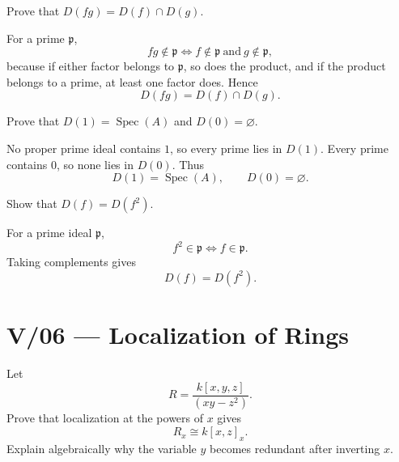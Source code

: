 \begin{problem}[CP-V-0102]
\label{prob:cp-v-0102}
Prove that \(D(fg)=D(f)\cap D(g)\).
\end{problem}

\begin{solution}
For a prime \(\mathfrak p\),
\[
fg\notin\mathfrak p
\iff
f\notin\mathfrak p\ \text{and}\ g\notin\mathfrak p,
\]
because if either factor belongs to \(\mathfrak p\), so does the product, and if the product belongs to a prime, at least one factor does. Hence
\[
D(fg)=D(f)\cap D(g).
\]
\end{solution}


\begin{problem}[CP-V-0103]
\label{prob:cp-v-0103}
Prove that \(D(1)=\operatorname{Spec}(A)\) and \(D(0)=\varnothing\).
\end{problem}

\begin{solution}
No proper prime ideal contains \(1\), so every prime lies in \(D(1)\). Every prime contains \(0\), so none lies in \(D(0)\). Thus
\[
D(1)=\operatorname{Spec}(A),\qquad D(0)=\varnothing.
\]
\end{solution}


\begin{problem}[CP-V-0104]
\label{prob:cp-v-0104}
Show that \(D(f)=D(f^2)\).
\end{problem}

\begin{solution}
For a prime ideal \(\mathfrak p\),
\[
f^2\in\mathfrak p\iff f\in\mathfrak p.
\]
Taking complements gives
\[
D(f)=D(f^2).
\]
\end{solution}



\section*{V/06 --- Localization of Rings}

\begin{problem}[CP-V-0013]
\label{prob:cp-v-0013}
Let
\[
R=\frac{k[x,y,z]}{(xy-z^2)}.
\]
Prove that localization at the powers of \(x\) gives
\[
R_x\cong k[x,z]_x.
\]
Explain algebraically why the variable \(y\) becomes redundant after inverting
\(x\).
\end{problem}

